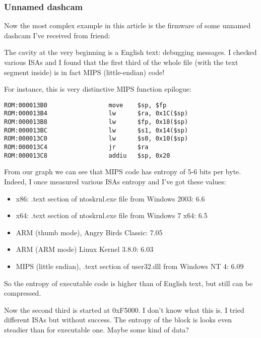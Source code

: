 \subsubsection{Unnamed dashcam}

Now the most complex example in this article is the firmware of some unnamed dashcam I've received from friend:

\begin{figure}[H]
\centering
{}
\end{figure}

The cavity at the very beginning is a English text: debugging messages.
I checked various ISAs and I found that 
the first third of the whole file (with the text segment inside) is in fact MIPS (little-endian) code!

For instance, this is very distinctive MIPS function epilogue:

\begin{lstlisting}
ROM:000013B0                 move    $sp, $fp
ROM:000013B4                 lw      $ra, 0x1C($sp)
ROM:000013B8                 lw      $fp, 0x18($sp)
ROM:000013BC                 lw      $s1, 0x14($sp)
ROM:000013C0                 lw      $s0, 0x10($sp)
ROM:000013C4                 jr      $ra
ROM:000013C8                 addiu   $sp, 0x20
\end{lstlisting}

From our graph we can see that MIPS code has entropy of 5-6 bits per byte.
Indeed, I once measured various ISAs entropy and I've got these values:

\begin{itemize}
\item x86: .text section of ntoskrnl.exe file from Windows 2003: 6.6
\item x64: .text section of ntoskrnl.exe file from Windows 7 x64: 6.5
\item ARM (thumb mode), Angry Birds Classic: 7.05
\item ARM (ARM mode) Linux Kernel 3.8.0: 6.03
\item MIPS (little endian), .text section of user32.dll from Windows NT 4: 6.09
\end{itemize}

So the entropy of executable code is higher than of English text, but still can be compressed.

Now the second third is started at 0xF5000. I don't know what this is. I tried different ISAs but without success.
The entropy of the block is looks even steadier than for executable one.
Maybe some kind of data?


